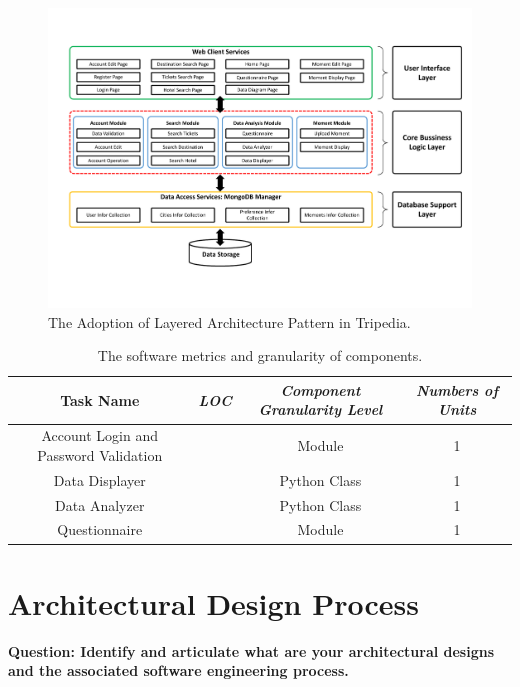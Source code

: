 \documentclass[conference]{IEEEtran}
\begin{document}
\begin{figure}[htbp]
\centerline{\includegraphics[width=1.0\textwidth]{Architecture2.pdf}}
\caption{The Adoption of Layered Architecture Pattern in Tripedia.}
\label{system_layered}
\end{figure}

\begin{table}[htbp]
\caption{The software metrics and granularity of components.}
\begin{center}
\begin{tabular}{|c|c|c|c|}
\hline
\textbf{Task Name} & \textbf{\textit{LOC}}& \textbf{\textit{Component Granularity Level}}& \textbf{\textit{Numbers of Units}} \\
\hline
Account Login and Password Validation &  & Module & 1 \\
Data Displayer &   & Python Class & 1 \\
Data Analyzer &  & Python Class &  1 \\
Questionnaire &  & Module & 1 \\
\hline
\end{tabular}
\label{tab1}
\end{center}
\end{table}



\section{\textbf{Architectural Design Process}}

\textbf{Question: Identify and articulate what are your architectural designs and the associated
software engineering process.}
\end{document}
